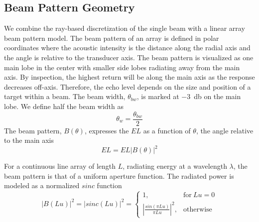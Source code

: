 \documentclass[11pt]{article}
\begin{document}

\subsection{Beam Pattern Geometry}
We combine the ray-based discretization of the single beam with a linear array beam pattern model. The beam pattern of an array is defined in polar coordinates where the acoustic intensity is the distance along the radial axis and the angle is relative to the transducer axis. The beam pattern is visualized as one main lobe in the center with smaller side lobes radiating away from the main axis. By inspection, the highest return will be along the main axis as the response decreases off-axis. Therefore, the echo level depends on the size and position of a target within a beam. The beam width, $\theta_{bw}$, is marked at \SI{-3}{\decibel} on the main lobe. We define half the beam width as 
\begin{equation}
    \theta_w = \frac{\theta_{bw}}{2}
\end{equation}
The beam pattern, $B(\theta)$, expresses the $EL$ as a function of $\theta$, the angle relative to the main axis
\begin{equation}
    EL = EL|B(\theta)|^2
\end{equation}

For a continuous line array of length $L$, radiating energy at a wavelength $\lambda$, the beam pattern is that of a uniform aperture function. The radiated power is modeled as a normalized $sinc$ function
\begin{equation}
    |B(Lu)|^2 = |sinc(Lu)|^2 = \begin{cases}
      1, & \mathrm{for}\: Lu = 0 \\
      \left| \frac{sin(\pi L u)}{\pi L u}\right|^2, & \mathrm{otherwise}
    \end{cases}
\end{equation}
\end{document}
